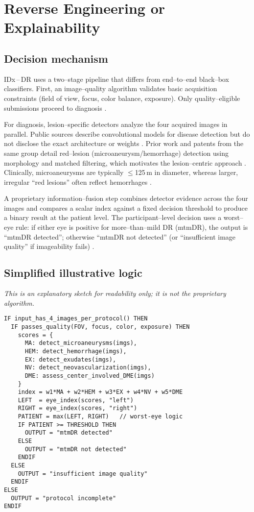 \documentclass[sigconf]{acmart}
\begin{document}
\section{Reverse Engineering or Explainability}

\subsection{Decision mechanism}

IDx\textsuperscript{\textregistered}\,–\,DR uses a two–stage pipeline that differs from end–to–end black–box classifiers. First, an image–quality algorithm validates basic acquisition constraints (field of view, focus, color balance, exposure). Only quality–eligible submissions proceed to diagnosis \citep{FDA2018DEN180001,Abramoff2018Pivotal}. 

For diagnosis, lesion–specific detectors analyze the four acquired images in parallel. Public sources describe convolutional models for disease detection but do not disclose the exact architecture or weights \citep{Abramoff2018Pivotal,FDA2018DEN180001}. Prior work and patents from the same group detail red–lesion (microaneurysm/hemorrhage) detection using morphology and matched filtering, which motivates the lesion–centric approach \citep{US7474775B2}. Clinically, microaneurysms are typically $\le$125\,\textmu m in diameter, whereas larger, irregular “red lesions” often reflect hemorrhages \citep{Shukla2023StatPearlsDR,Yu1998ArchOph}. 

A proprietary information–fusion step combines detector evidence across the four images and compares a scalar index against a fixed decision threshold to produce a binary result at the patient level. The participant–level decision uses a worst–eye rule: if either eye is positive for more–than–mild DR (mtmDR), the output is “mtmDR detected”; otherwise “mtmDR not detected” (or “insufficient image quality” if imageability fails) \citep{Abramoff2018Pivotal,FDA2018DEN180001}.

\subsection{Simplified illustrative logic}

\noindent\textit{This is an explanatory sketch for readability only; it is not the proprietary algorithm.}

\begin{verbatim}
IF input_has_4_images_per_protocol() THEN
  IF passes_quality(FOV, focus, color, exposure) THEN
    scores = {
      MA: detect_microaneurysms(imgs),
      HEM: detect_hemorrhage(imgs),
      EX: detect_exudates(imgs),
      NV: detect_neovascularization(imgs),
      DME: assess_center_involved_DME(imgs)
    }
    index = w1*MA + w2*HEM + w3*EX + w4*NV + w5*DME
    LEFT  = eye_index(scores, "left")
    RIGHT = eye_index(scores, "right")
    PATIENT = max(LEFT, RIGHT)   // worst-eye logic
    IF PATIENT >= THRESHOLD THEN
      OUTPUT = "mtmDR detected"      
    ELSE
      OUTPUT = "mtmDR not detected"  
    ENDIF
  ELSE
    OUTPUT = "insufficient image quality"  
  ENDIF
ELSE
  OUTPUT = "protocol incomplete"           
ENDIF
\end{verbatim}
\end{document}
